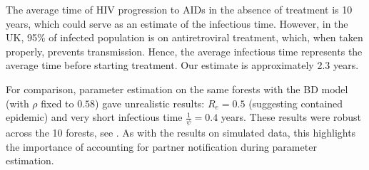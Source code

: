 \documentclass[10pt,letterpaper]{article}
\begin{document}
The average time of HIV progression to AIDs in the absence of treatment is 10 years, which could serve as an estimate of the infectious time. However, in the UK, 95\% of infected population is on antiretroviral treatment, which, when taken properly, prevents transmission. Hence, the average infectious time represents the average time before starting treatment. Our estimate is approximately 2.3 years. 

For comparison, parameter estimation on the same forests with the BD model (with $\rho$ fixed to $0.58$) gave unrealistic results: $R_e = 0.5$ (suggesting contained epidemic) and very short infectious time $\frac{1}{\psi} = 0.4$ years. These results were robust across the 10 forests, see . As with the results on simulated data, this  highlights the importance of accounting for partner notification during parameter estimation.
\end{document}
